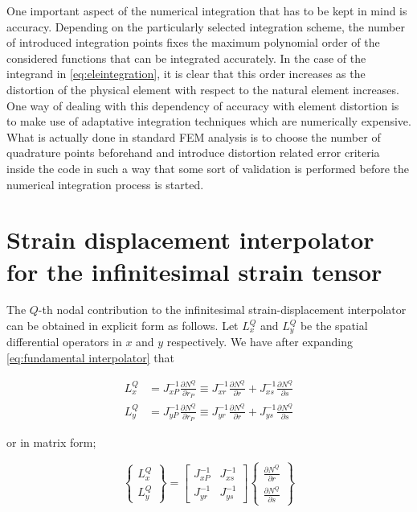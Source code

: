 One important aspect of the numerical integration that has to be kept in mind is accuracy.  Depending on the particularly selected integration scheme, the number of introduced integration points fixes the maximum polynomial order of the considered functions that can be integrated accurately.  In the case of the integrand in \cref{eq:eleintegration}, it is clear that this order increases as the distortion of the physical element  with respect to the natural element increases.  One way of dealing with this dependency of accuracy with element distortion is to make use of adaptative integration techniques which are numerically expensive.  What is actually done in standard FEM analysis is to choose the number of quadrature points beforehand and introduce distortion related error criteria inside the code in such a way that some sort of validation is performed before the numerical integration process is started.

\section*{Strain displacement interpolator for the infinitesimal strain tensor}
The $Q$-th nodal contribution to the infinitesimal strain-displacement interpolator can be obtained in explicit form as follows. Let $L_x^Q$ and $L_y^Q$ be the spatial differential operators in $x$ and $y$ respectively. We have after expanding \cref{eq:fundamental interpolator}  that

\begin{align*}
L_x^Q & = J_{xP}^{-1}\frac{{\partial {N^Q}}}{\partial {r_P}} \equiv J_{xr}^{-1}\frac{{\partial {N^Q}}}{{\partial r}} + J_{xs}^{ - 1}\frac{{\partial {N^Q}}}{{\partial s}}\\
L_y^Q & = J_{yP}^{ - 1}\frac{{\partial {N^Q}}}{{\partial {r_P}}} \equiv J_{yr}^{ - 1}\frac{{\partial {N^Q}}}{{\partial r}} + J_{ys}^{-1}\frac{\partial {N^Q}}{\partial s}
\end{align*}

or in matrix form;

\begin{equation}
\left\{ {\begin{array}{*{20}{c}}
{L_x^Q}\\
{L_y^Q}
\end{array}} \right\} = \left[ {\begin{array}{*{20}{c}}
{J_{xP}^{ - 1}}&{J_{xs}^{ - 1}}\\
{J_{yr}^{ - 1}}&{J_{ys}^{ - 1}}
\end{array}} \right]\left\{ {\begin{array}{*{20}{c}}
{\frac{{\partial {N^Q}}}{{\partial r}}}\\
{\frac{{\partial {N^Q}}}{{\partial s}}}
\end{array}} \right\}
\end{equation}

